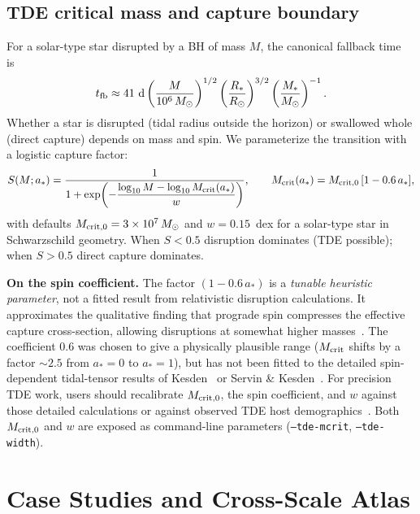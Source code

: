 \documentclass[11pt]{article}
\begin{document}
\subsection{TDE critical mass and capture boundary}\label{sec:tde}

For a solar-type star disrupted by a BH of mass $M$, the canonical fallback time~\cite{Rees1988,Phinney1989} is
\begin{equation}
t_{\rm fb} \approx 41~\text{d}\left(\frac{M}{10^6\,M_\odot}\right)^{1/2}\left(\frac{R_*}{R_\odot}\right)^{3/2}\left(\frac{M_*}{M_\odot}\right)^{-1}.\label{eq:tfb}
\end{equation}
Whether a star is disrupted (tidal radius outside the horizon) or swallowed whole (direct capture) depends on mass and spin.
We parameterize the transition with a logistic capture factor:
\begin{equation}
S(M; a_*) = \frac{1}{1+\exp\!\left(-\dfrac{\log_{10}M - \log_{10}M_{\rm crit}(a_*)}{w}\right)},\qquad
M_{\rm crit}(a_*) = M_{\rm crit,0}\,[1 - 0.6\,a_*],\label{eq:tde_logistic}
\end{equation}
with defaults $M_{\rm crit,0}=3\times 10^7\,M_\odot$ and $w=0.15$~dex for a solar-type star in Schwarzschild geometry.
When $S<0.5$ disruption dominates (TDE possible); when $S>0.5$ direct capture dominates.

\textbf{On the spin coefficient.}
The factor $(1-0.6\,a_*)$ is a \emph{tunable heuristic parameter}, not a fitted result from relativistic disruption calculations.
It approximates the qualitative finding that prograde spin compresses the effective capture cross-section, allowing disruptions at somewhat higher masses~\cite{Kesden2012,ServinKesden2017}.
The coefficient 0.6 was chosen to give a physically plausible range ($M_{\rm crit}$ shifts by a factor $\sim 2.5$ from $a_*=0$ to $a_*=1$), but has not been fitted to the detailed spin-dependent tidal-tensor results of Kesden~\cite{Kesden2012} or Servin \& Kesden~\cite{ServinKesden2017}.
For precision TDE work, users should recalibrate $M_{\rm crit,0}$, the spin coefficient, and $w$ against those detailed calculations or against observed TDE host demographics~\cite{vanVelzen2020,French2020}.
Both $M_{\rm crit,0}$ and $w$ are exposed as command-line parameters (\texttt{--tde-mcrit}, \texttt{--tde-width}).


\section{Case Studies and Cross-Scale Atlas}\label{sec:casestudies}
\end{document}
